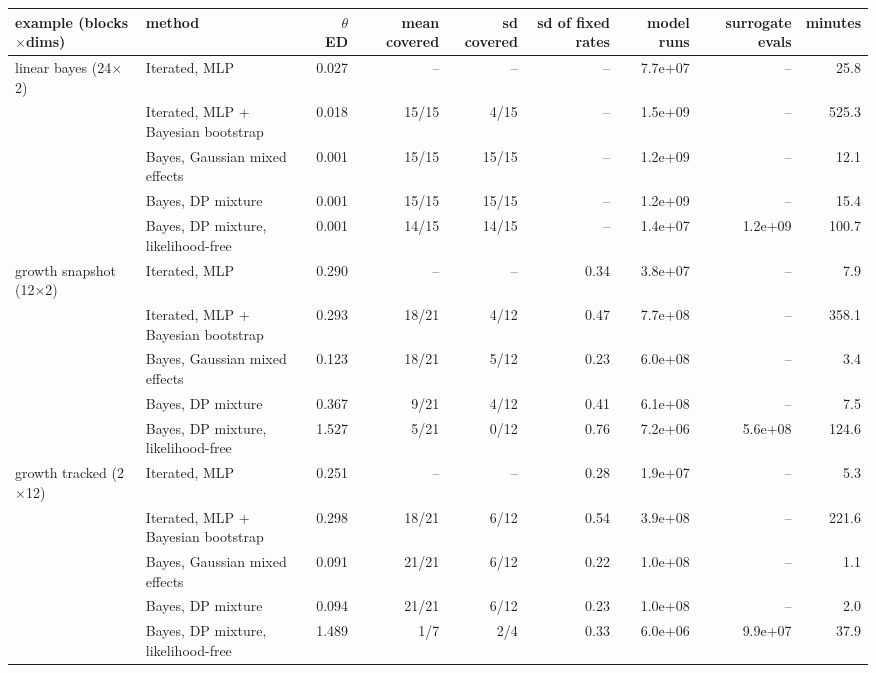 \begin{tabular}{llrrrrrrr}
\toprule
example (blocks$\times$dims) & method & $\theta$ ED & mean covered & sd covered & sd of fixed rates & model runs & surrogate evals & minutes \\
\midrule
linear bayes (24$\times$2) & Iterated, MLP & 0.027 & -- & -- & -- & 7.7e+07 & -- & 25.8 \\
 & Iterated, MLP + Bayesian bootstrap & 0.018 & 15/15 & 4/15 & -- & 1.5e+09 & -- & 525.3 \\
 & Bayes, Gaussian mixed effects & 0.001 & 15/15 & 15/15 & -- & 1.2e+09 & -- & 12.1 \\
 & Bayes, DP mixture & 0.001 & 15/15 & 15/15 & -- & 1.2e+09 & -- & 15.4 \\
 & Bayes, DP mixture, likelihood-free & 0.001 & 14/15 & 14/15 & -- & 1.4e+07 & 1.2e+09 & 100.7 \\ \addlinespace
growth snapshot (12$\times$2) & Iterated, MLP & 0.290 & -- & -- & 0.34 & 3.8e+07 & -- & 7.9 \\
 & Iterated, MLP + Bayesian bootstrap & 0.293 & 18/21 & 4/12 & 0.47 & 7.7e+08 & -- & 358.1 \\
 & Bayes, Gaussian mixed effects & 0.123 & 18/21 & 5/12 & 0.23 & 6.0e+08 & -- & 3.4 \\
 & Bayes, DP mixture & 0.367 & 9/21 & 4/12 & 0.41 & 6.1e+08 & -- & 7.5 \\
 & Bayes, DP mixture, likelihood-free & 1.527 & 5/21 & 0/12 & 0.76 & 7.2e+06 & 5.6e+08 & 124.6 \\ \addlinespace
growth tracked (2$\times$12) & Iterated, MLP & 0.251 & -- & -- & 0.28 & 1.9e+07 & -- & 5.3 \\
 & Iterated, MLP + Bayesian bootstrap & 0.298 & 18/21 & 6/12 & 0.54 & 3.9e+08 & -- & 221.6 \\
 & Bayes, Gaussian mixed effects & 0.091 & 21/21 & 6/12 & 0.22 & 1.0e+08 & -- & 1.1 \\
 & Bayes, DP mixture & 0.094 & 21/21 & 6/12 & 0.23 & 1.0e+08 & -- & 2.0 \\
 & Bayes, DP mixture, likelihood-free & 1.489 & 1/7 & 2/4 & 0.33 & 6.0e+06 & 9.9e+07 & 37.9 \\
\bottomrule
\end{tabular}
